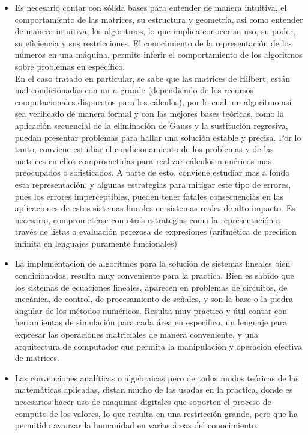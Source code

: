\documentclass[11pt, spanish]{article}
\begin{document}
\begin{itemize}
  \item Es necesario contar con sólida bases para entender de manera intuitiva, el comportamiento de las matrices, su estructura y geometría, asi como entender de manera intuitiva, los algoritmos, lo que implica conocer su uso, su poder, su eficiencia y sus restricciones. El conocimiento de la representación de los números en una máquina, permite inferir el comportamiento de los algoritmos sobre problemas en específico.\\
  
  En el caso tratado en particular, se sabe que las matrices de Hilbert, están mal condicionadas con un $n$ grande (dependiendo de los recursos computacionales dispuestos para los cálculos), por lo cual, un algoritmo así sea verificado de manera formal y con las mejores bases teóricas, como la aplicación secuencial de la eliminación de Gauss y la sustitución regresiva, puedan presentar problemas para hallar una solución estable y precisa. Por lo tanto, conviene estudiar el condicionamiento de los problemas y de las matrices en ellos comprometidas para realizar cálculos numéricos mas preocupados o sofisticados. A parte de esto, conviene estudiar mas a fondo esta representación, y algunas estrategias para mitigar este tipo de errores, pues los errores imperceptibles, pueden tener fatales consecuencias en las aplicaciones de estos sistemas lineales en sistemas reales de alto impacto. Es necesario, comprometerse con otras estrategias como la representación a través de listas o evaluación perezosa de expresiones (aritmética de precision infinita en lenguajes puramente funcionales)
  
   \item La implementacion de algoritmos para la solución de sistemas lineales bien condicionados, resulta muy conveniente para la practica. Bien es sabido que los sistemas de ecuaciones lineales, aparecen en problemas de circuitos, de mecánica, de control, de procesamiento de señales, y son la base o la piedra angular de los métodos numéricos. Resulta muy practico y útil contar con herramientas de simulación para cada área en especifico,  un lenguaje para expresar las operaciones matriciales de manera conveniente, y una arquitectura de computador que permita la manipulación y operación efectiva de matrices.
   
   \item Las convenciones analíticas o algebraicas pero de todos modos teóricas de las matemáticas aplicadas, distan mucho de las usadas en la practica, donde es necesarios hacer uso de maquinas digitales que soporten el proceso de computo de los valores, lo que resulta en una restricción grande, pero que ha permitido avanzar la humanidad en varias áreas del conocimiento.
\end{itemize}
\end{document}

